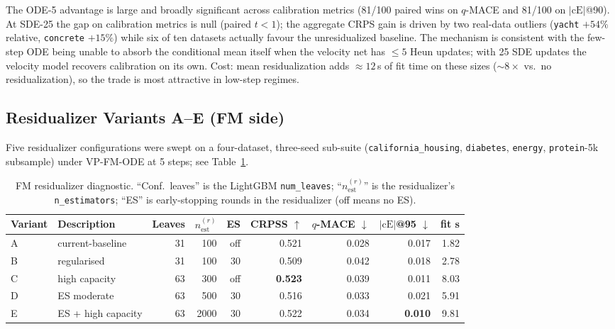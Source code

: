 \documentclass{tpm2026}
\begin{document}
The ODE-5 advantage is large and broadly significant across calibration metrics (81/100 paired wins on $q$-MACE and 81/100 on $|\text{cE}|$@90). At SDE-25 the gap on calibration metrics is null (paired $t<1$); the aggregate CRPS gain is driven by two real-data outliers (\texttt{yacht} $+54\%$ relative, \texttt{concrete} $+15\%$) while six of ten datasets actually favour the unresidualized baseline. The mechanism is consistent with the few-step ODE being unable to absorb the conditional mean itself when the velocity net has $\leq 5$ Heun updates; with 25 SDE updates the velocity model recovers calibration on its own. Cost: mean residualization adds $\approx 12$\,s of fit time on these sizes ($\sim 8\times$ vs.\ no residualization), so the trade is most attractive in low-step regimes.

\subsection{Residualizer Variants A--E (FM side)}\label{app:resid-AE}

Five residualizer configurations were swept on a four-dataset, three-seed sub-suite (\texttt{california\_housing}, \texttt{diabetes}, \texttt{energy}, \texttt{protein}-5k subsample) under VP-FM-ODE at 5 steps; see Table~\ref{tab:resid-AE}.

\begin{table}[!h]
  \centering
  \caption{FM residualizer diagnostic. ``Conf.\ leaves'' is the LightGBM \texttt{num\_leaves}; ``$n_{\text{est}}^{(r)}$'' is the residualizer's \texttt{n\_estimators}; ``ES'' is early-stopping rounds in the residualizer (off means no ES).}\label{tab:resid-AE}
  \footnotesize
  \begin{tabular}{llrrrrrrr}
    \toprule
    Variant & Description & Leaves & $n_{\text{est}}^{(r)}$ & ES & CRPSS $\uparrow$ & $q$-MACE $\downarrow$ & $|\text{cE}|$@95 $\downarrow$ & fit s \\
    \midrule
    A & current-baseline   & 31 & 100 & off & 0.521 & 0.028 & 0.017 & 1.82 \\
    B & regularised        & 31 & 100 & 30  & 0.509 & 0.042 & 0.018 & 2.78 \\
    C & high capacity      & 63 & 300 & off & \textbf{0.523} & 0.039 & 0.011 & 8.03 \\
    D & ES moderate        & 63 & 500 & 30  & 0.516 & 0.033 & 0.021 & 5.91 \\
    E & ES + high capacity & 63 & 2000& 30  & 0.522 & 0.034 & \textbf{0.010} & 9.81 \\
    \bottomrule
  \end{tabular}
\end{table}
\end{document}
